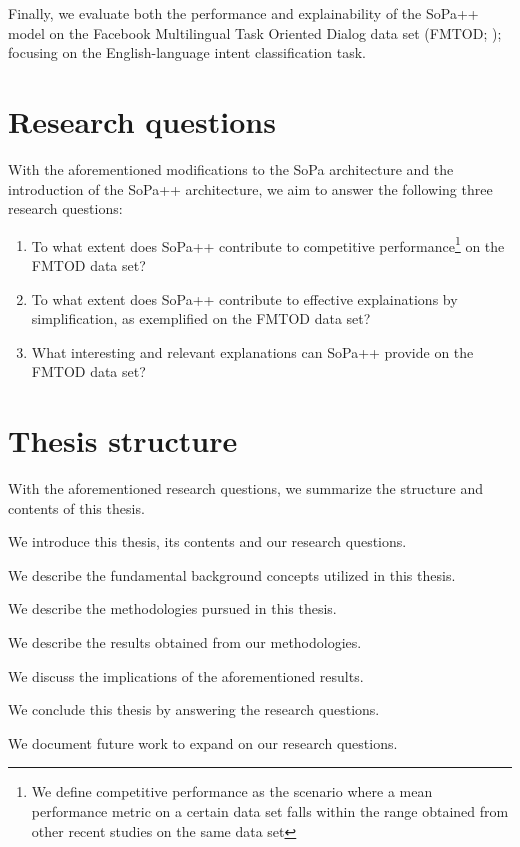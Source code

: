 Finally, we evaluate both the performance and explainability of the SoPa++ model on the Facebook Multilingual Task Oriented Dialog data set (FMTOD; \citealt{schuster2018cross}); focusing on the English-language intent classification task.

\section{Research questions}

With the aforementioned modifications to the SoPa architecture and the introduction of the SoPa++ architecture, we aim to answer the following three research questions:

\begin{enumerate}
  \item To what extent does SoPa++ contribute to competitive performance\footnote{We define competitive performance as the scenario where a mean performance metric on a certain data set falls within the range obtained from other recent studies on the same data set} on the FMTOD data set?
  \item To what extent does SoPa++ contribute to effective explainations by simplification, as exemplified on the FMTOD data set?
  \item What interesting and relevant explanations can SoPa++ provide on the FMTOD data set?
\end{enumerate}

\section{Thesis structure}

With the aforementioned research questions, we summarize the structure and contents of this thesis.

\begin{description}[align=left]
  \item [Chapter 1:] We introduce this thesis, its contents and our research questions.
  \item [Chapter 2:] We describe the fundamental background concepts utilized in this thesis.
  \item [Chapter 3:] We describe the methodologies pursued in this thesis.
  \item [Chapter 4:] We describe the results obtained from our methodologies.
  \item [Chapter 5:] We discuss the implications of the aforementioned results.
  \item [Chapter 6:] We conclude this thesis by answering the research questions.
  \item [Chapter 7:] We document future work to expand on our research questions.
\end{description}

